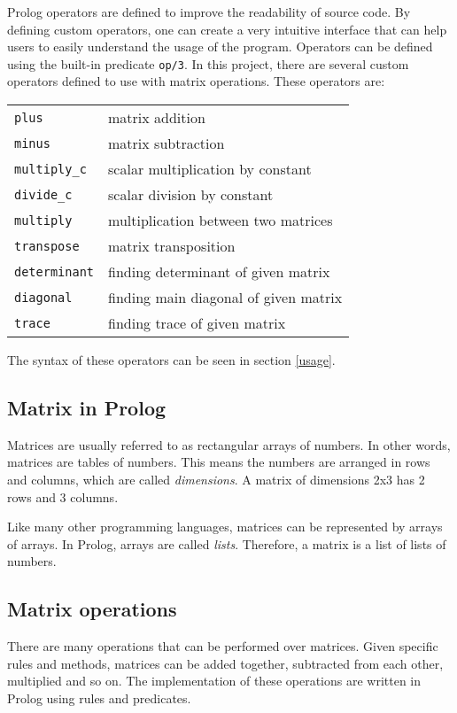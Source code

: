 \documentclass[a4paper]{article}
\begin{document}
Prolog operators are defined to improve the readability of source code. By defining custom operators, one can create a very intuitive interface that can help users to easily understand the usage of the program. Operators can be defined using the built-in predicate \texttt{op/3}. In this project, there are several custom operators defined to use with matrix operations. These operators are:
\begin{center}
\begin{tabular}{ l l }
 \texttt{plus} & matrix addition \\ 
 \texttt{minus} & matrix subtraction \\ 
 \texttt{multiply\_c} & scalar multiplication by constant \\ 
 \texttt{divide\_c} & scalar division by constant \\ 
 \texttt{multiply} & multiplication between two matrices \\ 
 \texttt{transpose} & matrix transposition \\ 
 \texttt{determinant} & finding determinant of given matrix \\
 \texttt{diagonal} & finding main diagonal of given matrix \\
 \texttt{trace} & finding trace of given matrix \\
\end{tabular}
\end{center}

The syntax of these operators can be seen in section \ref{usage}.

\subsection{Matrix in Prolog}
Matrices are usually referred to as rectangular arrays of numbers. In other words, matrices are tables of numbers. This means the numbers are arranged in rows and columns, which are called \textit{dimensions}. A matrix of dimensions 2x3 has 2 rows and 3 columns.

Like many other programming languages, matrices can be represented by arrays of arrays. In Prolog, arrays are called \textit{lists}. Therefore, a matrix is a list of lists of numbers.

\subsection{Matrix operations}
There are many operations that can be performed over matrices. Given specific rules and methods, matrices can be added together, subtracted from each other, multiplied and so on. The implementation of these operations are written in Prolog using rules and predicates.
\end{document}

